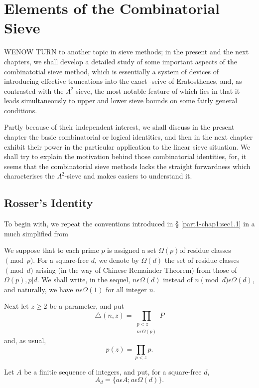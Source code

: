 \chapter{Elements of the Combinatorial Sieve}\label{chap2}

WE\pageoriginale NOW TURN  to another topic in sieve methods; in the
present and the 
next chapters, we shall develop a detailed study of some important
aspects of the combinatotial sieve method, which is essentially a
system of devices of introducing effective truncations into the exact
-seive of Eratosthenes, and, as contrasted with the $\Lambda^2$-sieve,
the most notable feature of which lies in that it leads simultaneously
to upper and lower sieve bounds on some fairly general conditions. 

Partly because of their independent interest, we shall discuss in the
present chapter the basic combinatorial or logical identities, and
then in the next chapter exhibit their power in the particular
application to the linear sieve situation. We shall try to explain the
motivation behind those combinatorial identities, for, it seems that
the combinatorial sieve methods lacks the straight forwardness which
characterises the $\Lambda^2$-sieve and makes easiers to understand it.

\section{Rosser's Identity}\label{chap2-sec2.1} %

To begin with, we repeat the conventions introduced in \S
\ref{part1-chap1:sec1.1} in a 
much simplified from 

We suppose that to each prime $p$ is assigned a set $\Omega(p)$\pageoriginale of
residue classes $\pmod{p}$. For a square-free $d$, we denote by
$\Omega(d)$ the set of residue classes $\pmod{d}$ arising (in the way
of Chinese Remainder Theorem) from those of $\Omega(p),p|d$. We shall
write, in the sequel, $n \epsilon  \Omega(d)$ instead of $n \pmod{d}
\epsilon  \Omega(d)$, and naturally, we have $n \epsilon  \Omega
(1)$ for all integer $n$. 

Next let $z \ge 2$ be a parameter, and put 
$$
\triangle (n,z) = \prod_{\substack{p < z\\ n \epsilon \Omega(p)}} P 
$$
and, as usual,
$$
p(z)= \prod_{p < z} p.
$$

Let $A$ be a finitie sequence of integers, and put, for a square-free $d$,
$$
A_d = \{ a \epsilon  A; a \epsilon  \Omega (d)\}.
$$

